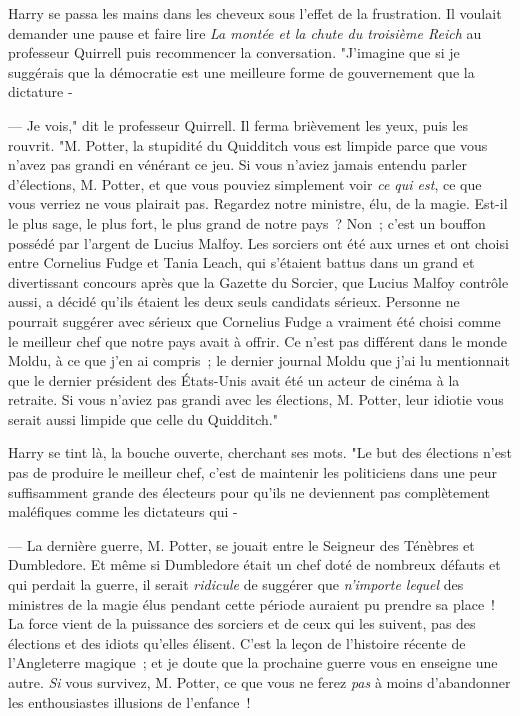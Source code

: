 Harry se passa les mains dans les cheveux sous l'effet de la frustration. Il voulait demander une pause et faire lire \emph{La montée et la chute du troisième Reich} au professeur Quirrell puis recommencer la conversation. "J'imagine que si je suggérais que la démocratie est une meilleure forme de gouvernement que la dictature -

--- Je vois," dit le professeur Quirrell. Il ferma brièvement les yeux, puis les rouvrit. "M. Potter, la stupidité du Quidditch vous est limpide parce que vous n'avez pas grandi en vénérant ce jeu. Si vous n'aviez jamais entendu parler d'élections, M. Potter, et que vous pouviez simplement voir \emph{ce qui est}, ce que vous verriez ne vous plairait pas. Regardez notre ministre, élu, de la magie. Est-il le plus sage, le plus fort, le plus grand de notre pays~? Non~; c'est un bouffon possédé par l'argent de Lucius Malfoy. Les sorciers ont été aux urnes et ont choisi entre Cornelius Fudge et Tania Leach, qui s'étaient battus dans un grand et divertissant concours après que la Gazette du Sorcier, que Lucius Malfoy contrôle aussi, a décidé qu'ils étaient les deux seuls candidats sérieux. Personne ne pourrait suggérer avec sérieux que Cornelius Fudge a vraiment été choisi comme le meilleur chef que notre pays avait à offrir. Ce n'est pas différent dans le monde Moldu, à ce que j'en ai compris~; le dernier journal Moldu que j'ai lu mentionnait que le dernier président des États-Unis avait été un acteur de cinéma à la retraite. Si vous n'aviez pas grandi avec les élections, M. Potter, leur idiotie vous serait aussi limpide que celle du Quidditch."

Harry se tint là, la bouche ouverte, cherchant ses mots. "Le but des élections n'est pas de produire le meilleur chef, c'est de maintenir les politiciens dans une peur suffisamment grande des électeurs pour qu'ils ne deviennent pas complètement maléfiques comme les dictateurs qui -

--- La dernière guerre, M. Potter, se jouait entre le Seigneur des Ténèbres et Dumbledore. Et même si Dumbledore était un chef doté de nombreux défauts et qui perdait la guerre, il serait \emph{ridicule} de suggérer que \emph{n'importe lequel} des ministres de la magie élus pendant cette période auraient pu prendre sa place~! La force vient de la puissance des sorciers et de ceux qui les suivent, pas des élections et des idiots qu'elles élisent. C'est la leçon de l'histoire récente de l'Angleterre magique~; et je doute que la prochaine guerre vous en enseigne une autre. \emph{Si} vous survivez, M. Potter, ce que vous ne ferez \emph{pas} à moins d'abandonner les enthousiastes illusions de l'enfance~!

